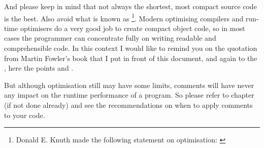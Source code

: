 And please keep in mind that not always the shortest, most compact source code is the best. Also avoid what is known as \footnote{Donald E. Knuth made the following statement on optimisation:  \autocite{Knuth:PrematureOptimization}}. Modern optimising compilers and run-time optimisers do a very good job to create compact object code, so in most cases the programmer can concentrate fully on writing readable and comprehensible code. In this context I would like to remind you on the quotation from Martin Fowler's book that I put in front of this document, and again to the \ngref, here the points  and .

But although optimisation still may have some limits, comments will have never any impact on the runtime performance of a program. So please refer to chapter  (if not done already) and see the recommendations on when to apply comments to your code.







